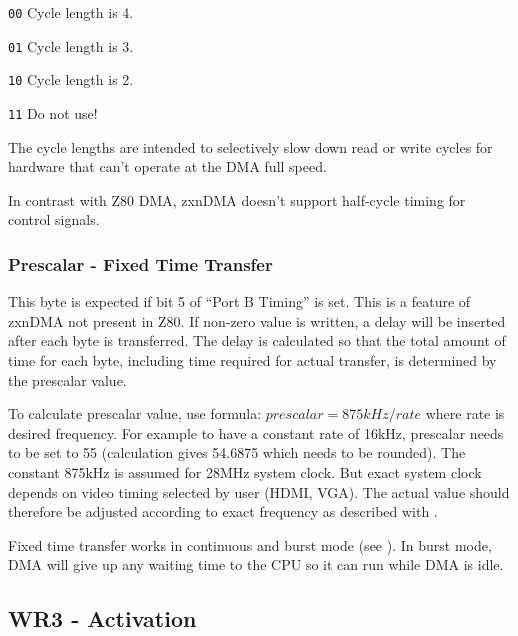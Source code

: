 {\begin{DMADescription}
{		\begin{DMAList}
			\item[{\tt 00}] Cycle length is 4.
			\item[{\tt 01}] Cycle length is 3.
			\item[{\tt 10}] Cycle length is 2.
			\item[{\tt 11}] Do not use!
		\end{DMAList}

		The cycle lengths are intended to selectively slow down read or write cycles for hardware that can't operate at the DMA full speed.
	}


\end{DMADescription}

In contrast with Z80 DMA, zxnDMA doesn't support half-cycle timing for control signals.


\subsubsection{Prescalar - Fixed Time Transfer}

This byte is expected if bit 5 of ``Port B Timing'' is set. This is a feature of zxnDMA not present in Z80. If non-zero value is written, a delay will be inserted after each byte is transferred. The delay is calculated so that the total amount of time for each byte, including time required for actual transfer, is determined by the prescalar value.

To calculate prescalar value, use formula: $prescalar = 875kHz / rate$ where rate is desired frequency. For example to have a constant rate of 16kHz, prescalar needs to be set to 55 (calculation gives 54.6875 which needs to be rounded). The constant 875kHz is assumed for 28MHz system clock. But exact system clock depends on video timing selected by user (HDMI, VGA). The actual value should therefore be adjusted according to exact frequency as described with .

Fixed time transfer works in continuous and burst mode (see ). In burst mode, DMA will give up any waiting time to the CPU so it can run while DMA is idle.


\pagebreak
\subsection{WR3 - Activation}

}
